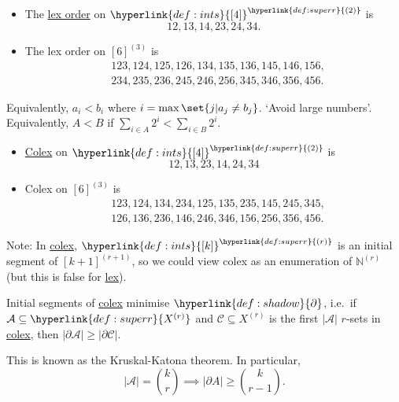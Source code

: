 \documentclass{article}
\newcommand{\named}[1]{\textbf{#1}\index{#1}}
\let\subset\subseteq
\begin{document}
\begin{eg}\leavevmode
  \begin{itemize}
    \item The \hyperlink{def:lex}{lex order} on $\hyperlink{def:ints}{[4]}^{\hyperlink{def:superr}{(2)}}$ is
      \begin{equation*}
        12,13,14,23,24,34.
      \end{equation*}
    \item The lex order on $[6]^{(3)}$ is
      \begin{align*}
        &123,124,125,126,134,135,136,145,146,156,\\
        &234,235,236,245,246,256,345,346,356,456.
      \end{align*}
  \end{itemize}
\end{eg}

Equivalently, $a_i < b_i$ where $i = \max\set{j | a_j \neq b_j}$.
`Avoid large numbers'. Equivalently, $A < B$ if $\sum_{i \in A} 2^i < \sum_{i \in B} 2^i$.
\begin{eg}\leavevmode
  \begin{itemize}
    \item \hyperlink{def:colex}{Colex} on $\hyperlink{def:ints}{[4]}^{\hyperlink{def:superr}{(2)}}$ is
      \begin{equation*}
        12,13,23,14,24,34
      \end{equation*}
    \item Colex on $[6]^{(3)}$ is
      \begin{align*}
        &123,124,134,234,125,135,235,145,245,345,\\
        &126,136,236,146,246,346,156,256,356,456.
      \end{align*}
  \end{itemize}
\end{eg}
Note: In \hyperlink{def:colex}{colex}, $\hyperlink{def:ints}{[k]}^{\hyperlink{def:superr}{(r)}}$ is an initial segment of $[k+1]^{(r+1)}$, so we could view colex as an enumeration of $\mathbb{N}^{(r)}$ (but this is false for \hyperlink{def:lex}{lex}).

\begin{aim}
  Initial segments of \hyperlink{def:colex}{colex} minimise $\hyperlink{def:shadow}{\partial}$, i.e.\ if $\mathcal{A} \subset \hyperlink{def:superr}{X^{(r)}}$ and $\mathcal{C} \subset X^{(r)}$ is the first $|\mathcal{A}|$ $r$-sets in \hyperlink{def:colex}{colex}, then $|\partial \mathcal{A}| \geq |\partial \mathcal{C}|$.
\end{aim}
This is known as the Kruskal-Katona theorem.
In particular, \begin{equation*}|\mathcal{A}| = \binom{k}{r} \implies |\partial A| \geq \binom{k}{r-1}.\end{equation*}
\end{document}
